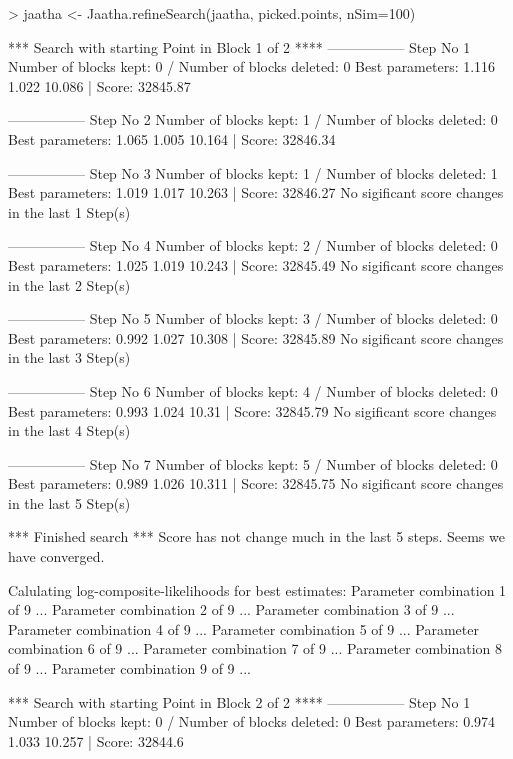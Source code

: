 
\begin{Schunk}
\begin{Sinput}
> jaatha <- Jaatha.refineSearch(jaatha, picked.points, nSim=100)
\end{Sinput}
\begin{Soutput}
*** Search with starting Point in Block 1 of 2 **** 
----------------- 
Step No 1 
Number of blocks kept: 0  / Number of blocks deleted: 0 
Best parameters:  1.116 1.022 10.086 | Score: 32845.87 

----------------- 
Step No 2 
Number of blocks kept: 1  / Number of blocks deleted: 0 
Best parameters:  1.065 1.005 10.164 | Score: 32846.34 

----------------- 
Step No 3 
Number of blocks kept: 1  / Number of blocks deleted: 1 
Best parameters:  1.019 1.017 10.263 | Score: 32846.27 
No sigificant score changes in the last 1 Step(s) 

----------------- 
Step No 4 
Number of blocks kept: 2  / Number of blocks deleted: 0 
Best parameters:  1.025 1.019 10.243 | Score: 32845.49 
No sigificant score changes in the last 2 Step(s) 

----------------- 
Step No 5 
Number of blocks kept: 3  / Number of blocks deleted: 0 
Best parameters:  0.992 1.027 10.308 | Score: 32845.89 
No sigificant score changes in the last 3 Step(s) 

----------------- 
Step No 6 
Number of blocks kept: 4  / Number of blocks deleted: 0 
Best parameters:  0.993 1.024 10.31 | Score: 32845.79 
No sigificant score changes in the last 4 Step(s) 

----------------- 
Step No 7 
Number of blocks kept: 5  / Number of blocks deleted: 0 
Best parameters:  0.989 1.026 10.311 | Score: 32845.75 
No sigificant score changes in the last 5 Step(s) 

*** Finished search *** 
Score has not change much in the last 5 steps. 
Seems we have converged. 

Calulating log-composite-likelihoods for best estimates: 
Parameter combination 1 of 9 ... 
Parameter combination 2 of 9 ... 
Parameter combination 3 of 9 ... 
Parameter combination 4 of 9 ... 
Parameter combination 5 of 9 ... 
Parameter combination 6 of 9 ... 
Parameter combination 7 of 9 ... 
Parameter combination 8 of 9 ... 
Parameter combination 9 of 9 ... 

*** Search with starting Point in Block 2 of 2 **** 
----------------- 
Step No 1 
Number of blocks kept: 0  / Number of blocks deleted: 0 
Best parameters:  0.974 1.033 10.257 | Score: 32844.6 


\end{Soutput}
\end{Schunk}
